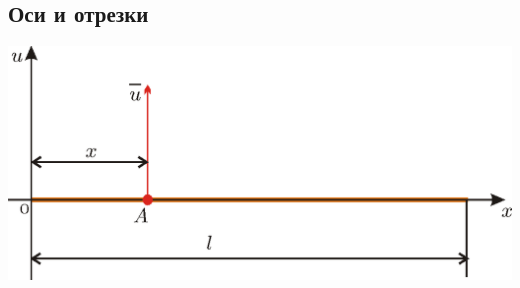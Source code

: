 \subsection[Оси]{Оси и отрезки}
	\begin{center} 
		\includegraphics[width=6.3in]{img/l2-1-1.png}
	\end{center}
	

\pagebreak %
